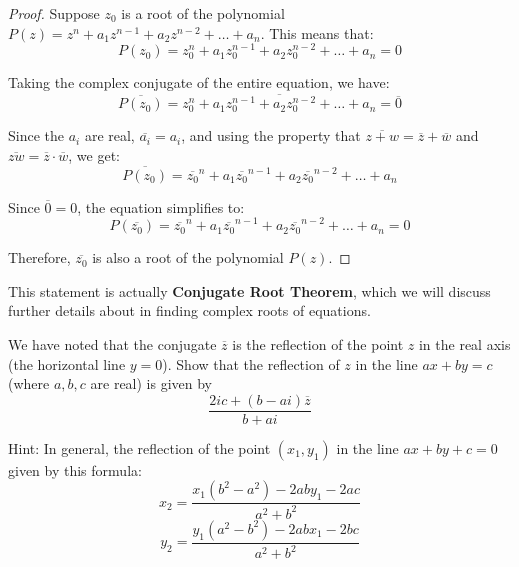                 \begin{proof}
                Suppose \( z_0 \) is a root of the polynomial \( P(z) = z^n + a_1z^{n-1} + a_2z^{n-2} + \ldots + a_n \). This means that:
                \[ P(z_0) = z_0^n + a_1z_0^{n-1} + a_2z_0^{n-2} + \ldots + a_n = 0 \]
                
                Taking the complex conjugate of the entire equation, we have:
                \[ \overline{P(z_0)} = \overline{z_0^n + a_1z_0^{n-1} + a_2z_0^{n-2} + \ldots + a_n} = \overline{0} \]
                
                Since the \( a_i \) are real, \( \overline{a_i} = a_i \), and using the property that \( \overline{z + w} = \overline{z} + \overline{w} \) and \( \overline{zw} = \overline{z}\cdot \overline{w} \), we get:
                \[ \overline{P(z_0)} = \overline{z_0}^n + a_1\overline{z_0}^{n-1} + a_2\overline{z_0}^{n-2} + \ldots + a_n \]
                
                Since \( \overline{0} = 0 \), the equation simplifies to:
                \[ P(\overline{z_0}) = \overline{z_0}^n + a_1\overline{z_0}^{n-1} + a_2\overline{z_0}^{n-2} + \ldots + a_n = 0 \]
                
                Therefore, \( \overline{z_0} \) is also a root of the polynomial \( P(z) \).
                \end{proof}
                \begin{remark}
                    This statement is actually \textbf{Conjugate Root Theorem}, which we will discuss further details about in finding
                    complex roots of equations.
                \end{remark}
            \begin{exercise}
                We have noted that the conjugate \( \overline{z} \) is the reflection of the point \( z \) in the real axis (the horizontal line \( y = 0 \)). Show that the reflection of \( z \) in the line \( ax + by = c \) (where \( a, b, c \) are real) is given by
\[ \frac{2ic    + (b - ai)\overline{z}}{b + ai} \]
            \end{exercise}
            Hint: In general, the reflection of the point \( (x_1, y_1) \) in the line \( ax + by + c = 0 \) given by this formula:
            \[ 
            x_2 = \frac{x_1(b^2 - a^2) - 2aby_1 - 2ac}{a^2 + b^2}
            \]
            \[ 
            y_2 = \frac{y_1(a^2 - b^2) - 2abx_1 - 2bc}{a^2 + b^2}
            \]
            
